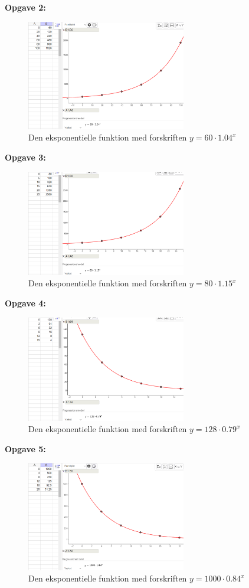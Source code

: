 \textbf{Opgave 2:}

\begin{figure}[ht]
\includegraphics[width=0.62\textwidth, height=0.27\textwidth]{ans_2}
\caption{Den eksponentielle funktion med forskriften $y = 60\cdot 1.04^x$}
\end{figure}

\textbf{Opgave 3:}

\begin{figure}[ht]
\includegraphics[width=0.62\textwidth, height=0.27\textwidth]{ans_3}
\caption{Den eksponentielle funktion med forskriften $y = 80 \cdot 1.15^x$}
\end{figure}

\newpage

\textbf{Opgave 4:}

\begin{figure}[ht]
\includegraphics[width=0.62\textwidth, height=0.27\textwidth]{ans_4}
\caption{Den eksponentielle funktion med forskriften $y =128\cdot 0.79^x $}
\end{figure}

\textbf{Opgave 5:}

\begin{figure}[ht]
\includegraphics[width=0.62\textwidth, height=0.27\textwidth]{ans_5}
\caption{Den eksponentielle funktion med forskriften $y = 1000\cdot 0.84^x$}
\end{figure}